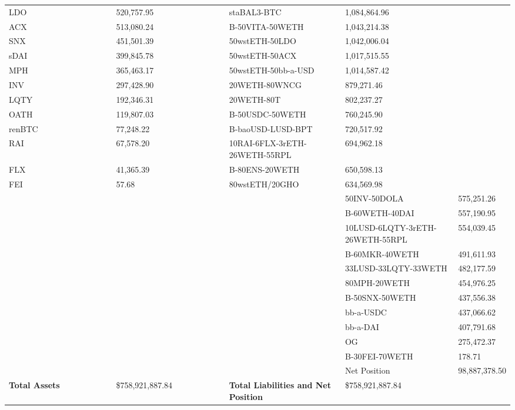 \begin{longtable}{@{}p{0.25\linewidth}p{0.25\linewidth}p{0.25\linewidth}p{0.25\linewidth}@{}}
LDO & 520,757.95 & staBAL3-BTC & 1,084,864.96 \\
ACX & 513,080.24 & B-50VITA-50WETH & 1,043,214.38 \\
SNX & 451,501.39 & 50wstETH-50LDO & 1,042,006.04 \\
sDAI & 399,845.78 & 50wstETH-50ACX & 1,017,515.55 \\
MPH & 365,463.17 & 50wstETH-50bb-a-USD & 1,014,587.42 \\
INV & 297,428.90 & 20WETH-80WNCG & 879,271.46 \\
LQTY & 192,346.31 & 20WETH-80T & 802,237.27 \\
OATH & 119,807.03 & B-50USDC-50WETH & 760,245.90 \\
renBTC & 77,248.22 & B-baoUSD-LUSD-BPT & 720,517.92 \\
RAI & 67,578.20 & 10RAI-6FLX-3rETH-26WETH-55RPL & 694,962.18 \\
FLX & 41,365.39 & B-80ENS-20WETH & 650,598.13 \\
FEI & 57.68 & 80wstETH/20GHO & 634,569.98 \\
 & &  & 50INV-50DOLA & 575,251.26 \\
 & &  & B-60WETH-40DAI & 557,190.95 \\
 & &  & 10LUSD-6LQTY-3rETH-26WETH-55RPL & 554,039.45 \\
 & &  & B-60MKR-40WETH & 491,611.93 \\
 & &  & 33LUSD-33LQTY-33WETH & 482,177.59 \\
 & &  & 80MPH-20WETH & 454,976.25 \\
 & &  & B-50SNX-50WETH & 437,556.38 \\
 & &  & bb-a-USDC & 437,066.62 \\
 & &  & bb-a-DAI & 407,791.68 \\
 & &  & OG & 275,472.37 \\
 & &  & B-30FEI-70WETH & 178.71 \\
 & &  & Net Position & 98,887,378.50 \\

\midrule

\textbf{Total Assets} & \$758,921,887.84 & \textbf{Total Liabilities and Net Position} & \$758,921,887.84 \\

\bottomrule

\end{longtable}
